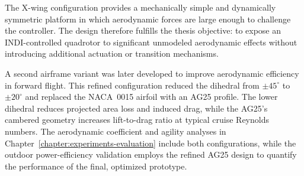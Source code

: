 The X-wing configuration provides a mechanically simple and dynamically symmetric platform in which aerodynamic forces are large enough to challenge the controller. The design therefore fulfills the thesis objective: to expose an INDI-controlled quadrotor to significant unmodeled aerodynamic effects without introducing additional actuation or transition mechanisms.

A second airframe variant was later developed to improve aerodynamic efficiency in forward flight.
This refined configuration reduced the dihedral from $\pm 45^{\circ}$ to $\pm 20^{\circ}$ and replaced the NACA~0015 airfoil with an AG25 profile.
The lower dihedral reduces projected area loss and induced drag, while the AG25's cambered geometry increases lift-to-drag ratio at typical cruise Reynolds numbers.
The aerodynamic coefficient and agility analyses in Chapter~\ref{chapter:experiments-evaluation} include both configurations, while the outdoor power-efficiency validation employs the refined AG25 design to quantify the performance of the final, optimized prototype.